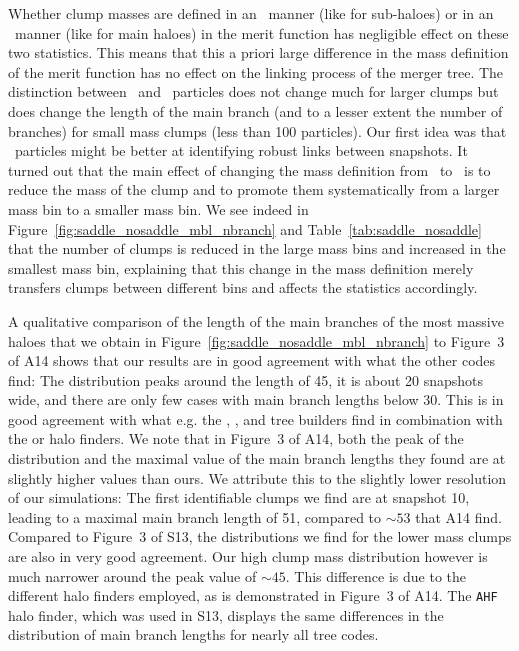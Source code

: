 Whether clump masses are defined in an \exc\ manner (like for
sub-haloes) or in an \inc\ manner (like for main haloes) in the merit
function has negligible effect on these two statistics. This means
that this a priori large difference in the mass definition of the
merit function has no effect on the linking process of the merger
tree.  The distinction between \sad\ and \nosad\ particles does not
change much for larger clumps but does change the length of the main
branch (and to a lesser extent the number of branches) for small mass
clumps (less than 100 particles). Our first idea was that
\sad\ particles might be better at identifying robust links between
snapshots. It turned out that the main effect of changing the mass
definition from \nosad\ to \sad\ is to reduce the mass of the clump and
to promote them systematically from a larger mass bin to a smaller
mass bin. We see indeed in
Figure~\ref{fig:saddle_nosaddle_mbl_nbranch} and
Table~\ref{tab:saddle_nosaddle} that the number of clumps is reduced
in the large mass bins and increased in the smallest mass bin,
explaining that this change in the mass definition merely transfers clumps
between different bins and affects the statistics accordingly.

A qualitative comparison of the length of the main branches of the most
massive haloes that we obtain in Figure~\ref{fig:saddle_nosaddle_mbl_nbranch}
to Figure~3 of A14 shows that our results are in good agreement with what
the other codes find: The distribution peaks around the length of 45, it
is about 20 snapshots wide, and there are only few cases with main branch
lengths below 30. This is in good agreement with what e.g. the
, , and  tree builders
find in combination with the  or  halo
finders. We note that in Figure~3 of A14, both the peak of the
distribution and the maximal value of the main branch lengths they found are
at slightly higher values than ours. We attribute this to the slightly lower
resolution of our simulations: The first identifiable clumps we find are at
snapshot 10, leading to a maximal main branch length of 51, compared to
$\sim 53$ that A14 find. Compared to Figure~3 of S13, the distributions we
find for the lower mass clumps are also in very good agreement. Our high
clump mass distribution however is much narrower around the peak value of
$\sim 45$. This difference is due to the different halo finders employed,
as is demonstrated in Figure~3 of A14. The \texttt{AHF} halo finder, which
was used in S13, displays the same differences in the distribution of
main branch lengths for nearly all tree codes.

